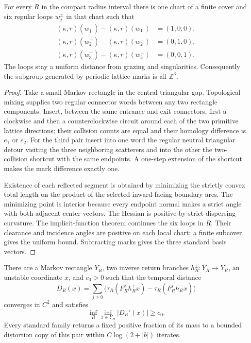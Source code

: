 \begin{lemma}
\label{lem:r14-a2-span}
For every \(R\) in the compact radius interval there is one chart of a finite
cover and six regular loops
\(w_j^\pm\) in that chart such that
\[
 \begin{aligned}
 (\kappa,r)(w_1^+)-(\kappa,r)(w_1^-)&=(1,0,0),\\
 (\kappa,r)(w_2^+)-(\kappa,r)(w_2^-)&=(0,1,0),\\
 (\kappa,r)(w_3^+)-(\kappa,r)(w_3^-)&=(0,0,1).
 \end{aligned}
\]
The loops stay a uniform distance from grazing and singularities.
Consequently the subgroup generated by periodic lattice marks is all
\(\mathbb Z^3\).
\end{lemma}

\begin{proof}
Take a small Markov rectangle in the central triangular gap.  Topological
mixing supplies two regular connector words between any two rectangle
components.  Insert, between the same entrance and exit connectors, first a
clockwise and then a counterclockwise circuit around each of the two primitive
lattice directions; their collision counts are equal and their homology
difference is \(e_1\) or \(e_2\).  For the third pair insert into one word the
regular neutral triangular detour visiting the three neighboring scatterers
and into the other the two-collision shortcut with the same endpoints.  A
one-step extension of the shortcut makes the mark difference exactly one.

Existence of each reflected segment is obtained by minimizing the strictly
convex total length on the product of the selected inward-facing boundary
arcs.  The minimizing point is interior because every endpoint normal makes a
strict angle with both adjacent center vectors.  The Hessian is positive by
strict dispersing curvature.  The implicit-function theorem continues the
six loops in \(R\).  Their clearance and incidence angles are positive on
each local chart; a finite subcover gives the uniform bound.  Subtracting
marks gives the three standard basis vectors.
\end{proof}

\begin{lemma}
\label{lem:r14-a2-uni}
There are a Markov rectangle \(Y_R\), two inverse return branches
\(h_R^\pm:Y_R\to Y_R\), an unstable coordinate \(x\), and \(c_0>0\) such that
the temporal distance
\[
 D_R(x)=
 \sum_{j\ge0}
 \bigl(\tau_R(F_R^jh_R^+x)-\tau_R(F_R^jh_R^-x)\bigr)
\]
converges in \(C^2\) and satisfies
\[
 \inf_R\inf_{x\in Y_R}|D_R'(x)|\ge c_0 .
\]
Every standard family returns a fixed positive fraction of its mass to a
bounded distortion copy of this pair within \(C\log(2+|b|)\) iterates.
\end{lemma}

